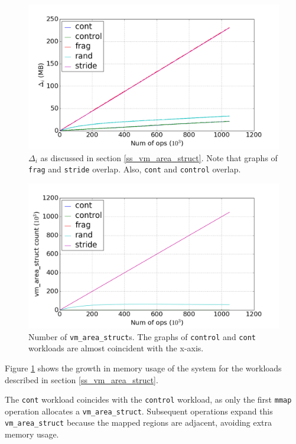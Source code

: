 \documentclass[twocolumn,11pt]{article}
\begin{document}
\begin{figure}[t]
    \includegraphics[width=\columnwidth]{figures/mmap_mem_usage}
    \caption{$\Delta_i$ as discussed in section \ref{ss_vm_area_struct}. Note that
    graphs of \texttt{frag} and \texttt{stride} overlap. Also, \texttt{cont} and
    \texttt{control} overlap.}
    \label{fig:mmap_mem_usage}
\end{figure}

\begin{figure}[t]
    \includegraphics[width=\columnwidth]{figures/vm_area_struct_count}
    \caption{Number of \texttt{vm\_area\_struct}s. The graphs of
    \texttt{control} and \texttt{cont} workloads are almost coincident with the
    x-axis.}
    \label{fig:vm_area_struct_count}
\end{figure}

Figure \ref{fig:mmap_mem_usage} shows the growth in memory usage of the system
for the workloads described in section \ref{ss_vm_area_struct}. 

The
\texttt{cont} workload coincides with the \texttt{control} workload, as only the
first \texttt{mmap} operation allocates a \texttt{vm\_area\_struct}. Subsequent
operations expand this \texttt{vm\_area\_struct} because the mapped
regions are adjacent, avoiding extra memory usage.  
\end{document}
